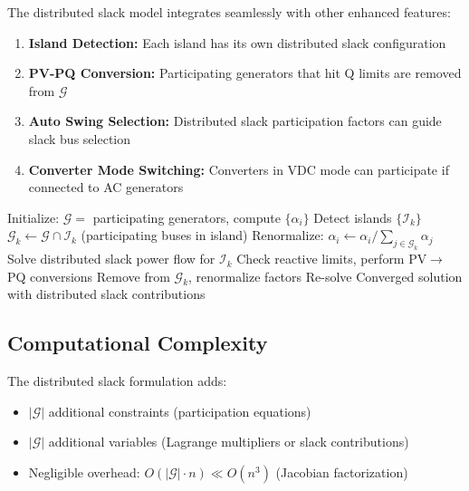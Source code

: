 \documentclass[11pt]{article}
\begin{document}
The distributed slack model integrates seamlessly with other enhanced features:

\begin{enumerate}
    \item \textbf{Island Detection:} Each island has its own distributed slack configuration
    \item \textbf{PV-PQ Conversion:} Participating generators that hit Q limits are removed from $\mathcal{G}$
    \item \textbf{Auto Swing Selection:} Distributed slack participation factors can guide slack bus selection
    \item \textbf{Converter Mode Switching:} Converters in VDC mode can participate if connected to AC generators
\end{enumerate}

\begin{algorithm}
\caption{Adaptive Power Flow with Distributed Slack}
\begin{algorithmic}[1]
\STATE Initialize: $\mathcal{G} =$ participating generators, compute $\{\alpha_i\}$
\STATE Detect islands $\{\mathcal{I}_k\}$
    \STATE $\mathcal{G}_k \gets \mathcal{G} \cap \mathcal{I}_k$ (participating buses in island)
    \STATE Renormalize: $\alpha_i \gets \alpha_i / \sum_{j \in \mathcal{G}_k} \alpha_j$
    \STATE Solve distributed slack power flow for $\mathcal{I}_k$
    \STATE Check reactive limits, perform PV$\to$PQ conversions
        \STATE Remove from $\mathcal{G}_k$, renormalize factors
        \STATE Re-solve
    \ENDIF
\ENDFOR
\RETURN Converged solution with distributed slack contributions
\end{algorithmic}
\end{algorithm}

\subsection{Computational Complexity}

The distributed slack formulation adds:
\begin{itemize}
    \item $|\mathcal{G}|$ additional constraints (participation equations)
    \item $|\mathcal{G}|$ additional variables (Lagrange multipliers or slack contributions)
    \item Negligible overhead: $O(|\mathcal{G}| \cdot n) \ll O(n^3)$ (Jacobian factorization)
\end{itemize}
\end{document}
